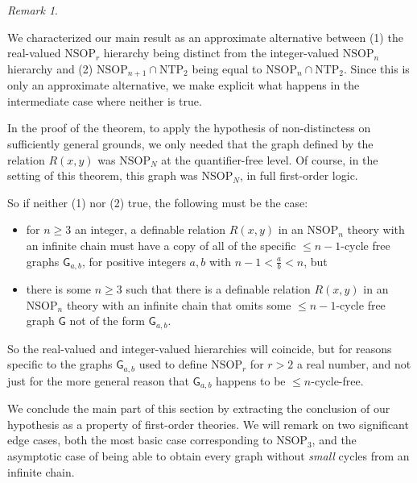 \documentclass{amsart}
\theoremstyle{definition}
\theoremstyle{remark}
\newtheorem{remark}[theorem]{Remark}
\numberwithin{equation}{section}
\begin{document}
\begin{remark}\label{intermediate possibility}

We characterized our main result as an approximate alternative between (1) the real-valued $\mathrm{NSOP}_{r}$
 hierarchy being distinct from the integer-valued $\mathrm{NSOP}_{n}$ hierarchy and (2) $\mathrm{NSOP}_{n+1} \cap \mathrm{NTP}_{2}$ being equal to $\mathrm{NSOP}_{n} \cap \mathrm{NTP}_{2}$. Since this is only an approximate alternative, we make explicit what happens in the intermediate case where neither is true.
 
 \: In the proof of the theorem, to apply the hypothesis of non-distinctess on sufficiently general grounds, we only needed that the graph defined by the relation $R(x, y)$ was $\mathrm{NSOP}_{N}$ at the quantifier-free level. Of course, in the setting of this theorem, this graph was $\mathrm{NSOP}_{N}$, in full first-order logic.
 
 \: So if neither (1) nor (2) true, the following must be the case: 


 \begin{itemize}
     \item  for $n \geq 3$ an integer, a definable relation $R(x, y)$ in an $\mathrm{NSOP}_{n}$ theory with an infinite chain must have a copy of all of the specific $\leq n-1$-cycle free graphs $\mathsf{G}_{a, b}$, for positive integers $a, b$ with $n-1 < \frac{a}{b} < n$, but 
 \item there is some $n \geq 3$ such that there is a definable relation $R(x, y)$ in an $\mathrm{NSOP}_{n}$ theory with an infinite chain that omits some $\leq n-1$-cycle free graph $\mathsf{G}$ not of the form $\mathsf{G}_{a, b}$. 
 \end{itemize}
  
 
 
 So the real-valued and integer-valued hierarchies will coincide, but for reasons specific to the graphs $\mathsf{G}_{a, b}$ used to define $\mathrm{NSOP}_{r}$ for $r > 2$ a real number, and not just for the more general reason that $\mathsf{G}_{a, b}$ happens to be $\leq n$-cycle-free.
    
\end{remark}


We conclude the main part of this section by extracting the conclusion of our hypothesis as a property of first-order theories. We will remark on two significant edge cases, both the most basic case corresponding to $\mathrm{NSOP}_{3}$, and the asymptotic case of being able to obtain every graph without \textit{small} cycles from an infinite chain.
\end{document}
